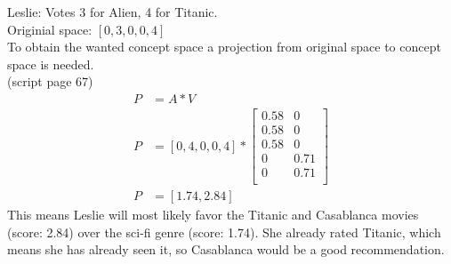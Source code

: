 

\newcommand{\ExerciseNumber}{11}

\newcommand{\PersonOne}{Marcel Bruckner (03674122)}
\newcommand{\PersonTwo}{Julian Hohenadel (03673879)}
\newcommand{\PersonThree}{Kevin Bein (03707775)}






%
%
%
\begin{flushleft}
Leslie: Votes 3 for Alien, 4 for Titanic.\\
Originial space: $[0, 3, 0, 0, 4]$\\
To obtain the wanted concept space a projection from original space to concept space is needed.\\
(script page 67)
\begin{align*}
P &= A * V \\
P &= [0, 4, 0, 0, 4] *
\begin{bmatrix}
0.58 & 0 \\
0.58 & 0 \\
0.58 & 0 \\
0 & 0.71 \\
0 & 0.71 \\
\end{bmatrix}
\\
P &= [1.74, 2.84]
\end{align*}
This means Leslie will most likely favor the Titanic and Casablanca movies (score: 2.84) over the sci-fi genre (score: 1.74). She already rated Titanic, which means she has already seen it, so Casablanca would be a good recommendation.\\
\end{flushleft}
%
%

